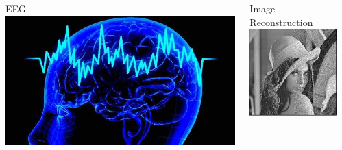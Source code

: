 \documentclass[10pt]{beamer}
\begin{document}
\begin{frame}[t]
\begin{columns}[T]
\begin{column}{.25\textwidth}
        	\end{column}\hfill
        	\begin{column}{.25\textwidth}
        		EEG\\
        		\includegraphics[width = \linewidth]{eeg_pic.jpg}
        	\end{column}\hfill
        	\begin{column}{.25\textwidth}
        		Image Reconstruction\\
        		\includegraphics[width = \linewidth]{lena_pic.jpg}
        	\end{column}
        \end{columns}
  \end{frame}
\end{document}
